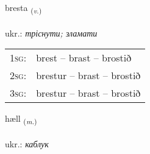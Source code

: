 \documentclass[frontgrid, backgrid]{flacards}\usepackage[]{graphicx}\usepackage[]{xcolor}
\begin{document}
\renewcommand{\flhead}{\vskip5pt \fboxsep=0pt {\small\bfseries\footnotesize Sagnorð | дієслово}}
\renewcommand{\fcfoot}{\vskip5pt \fboxsep=0pt \hspace{2pt}{\small\bfseries\footnotesize 3K}}

\renewcommand{\blhead}{\vskip5pt {\small\bfseries\footnotesize Sagnorð | дієслово }}
\renewcommand{\bcfoot}{\vskip5pt \hspace{2pt}{\small\bfseries\footnotesize 3K}}


{bresta \small{\textsubscript{(\textit{v.})}} \\[1ex] %
\textphonetic{[prɛsta]} \\
ukr.: \emph{тріснути; зламати} \\  [2ex]
\renewcommand*{\arraystretch}{0.8}
\begin{tabular}{p{1cm}l}
\textsc{1sg}: & brest -- brast -- brostið \\ 
\textsc{2sg}: & brestur -- brast -- brostið \\ 
\textsc{3sg}: & brestur -- brast -- brostið \\ 
\end{tabular}
}

\renewcommand{\flhead}{\vskip5pt \fboxsep=0pt {\small\bfseries\footnotesize Nafnorð | іменник}}
\renewcommand{\fcfoot}{\vskip5pt \fboxsep=0pt \hspace{2pt}{\small\bfseries\footnotesize 3K}}

\renewcommand{\blhead}{\vskip5pt {\small\bfseries\footnotesize Nafnorð | іменник }}
\renewcommand{\bcfoot}{\vskip5pt \hspace{2pt}{\small\bfseries\footnotesize 3K}}


{hæll \small{\textsubscript{(\textit{m.})}} \\[1ex] %
\textphonetic{[haitl̥]} \\
ukr.: \emph{каблук} \\  [2ex]
\renewcommand*{\arraystretch}{0.8}
}
\end{document}
